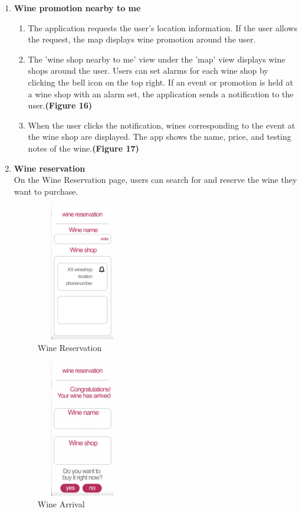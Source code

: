 \documentclass[sigconf, nonacm]{acmart}
\begin{document}
\begin{enumerate}
    \item \textbf{Wine promotion nearby to me}
    \begin{enumerate}
        \item The application requests the user’s location
information. If the user allows the request, the
map displays wine promotion around the user.
\item The ’wine shop nearby to me’ view under
the ’map’ view displays wine shops around
the user. Users can set alarms for each
wine shop by clicking the bell icon on
the top right. If an event or promotion is
held at a wine shop with an alarm set, the
application sends a notification to the user.\textbf{(Figure 16)}
\item When the user clicks the notification, wines
corresponding to the event at the wine shop are
displayed. The app shows the name, price, and
testing notes of the wine.\textbf{(Figure 17)}
    \end{enumerate}

    \item \textbf{Wine reservation}\\
    
   
    On the Wine Reservation page,
users can search for and reserve the wine they want
to purchase.
 
   \begin{figure}
  \centering
  \includegraphics[width=4cm, height=6cm]{wineres.png}
  \caption{Wine Reservation}
  \label{fig:wine reservation}
\end{figure}

\begin{figure}
  \centering
  \includegraphics[width=4cm, height=6cm]{winearrive.png}
  \caption{Wine Arrival}
  \label{fig:wine arrival}
\end{figure}
\begin{enumerate}



\end{enumerate}
\end{enumerate}
\end{document}
